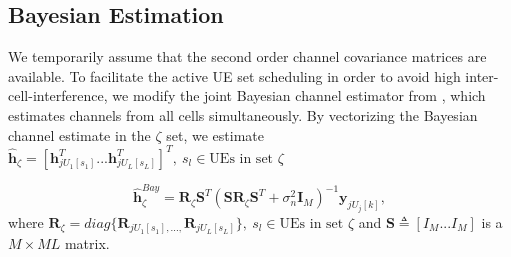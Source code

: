 \subsection{Bayesian Estimation}
We temporarily assume that the second order channel covariance matrices are available.  To facilitate the active UE set scheduling in order to avoid high inter-cell-interference, we modify the joint Bayesian channel estimator from \cite{yin2013coordinated}, which estimates channels from all cells simultaneously. By vectorizing the Bayesian channel estimate in the $\zeta$ set, we estimate $\hat{\mathbf{h}}_{\zeta}=[\mathbf{h}_{jU_{1}[s_{1}]}^{T}...\mathbf{h}_{jU_{L}[s_{L}]}^{T}]^{T},\:s_{l}\in \text{UEs in set } \zeta$ 

\begin{equation}
\hat{\mathbf{h}}_{\zeta}^{Bay}=\mathbf{R}_{\zeta}\mathbf{S}^{T}(\mathbf{S}\mathbf{R}_{\zeta}\mathbf{S}^{T}+\sigma_{n}^{2}\mathbf{I}_{M})^{-1}\mathbf{y}_{jU_{j}[k]},
\end{equation}
where $\mathbf{R}_{\zeta}=diag\{\mathbf{R}_{jU_{1}[s_{1}],...,}\mathbf{R}_{jU_{L}[s_{L}]}\},\:s_{l}\in \text{UEs in set } \zeta$ and $\mathbf{S}\triangleq[I_{M}...I_{M}]$ is a $M\times ML$ matrix.





